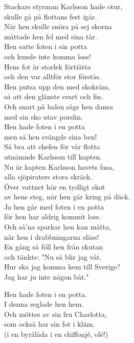 \documentclass[a6paper, 10pt, twoside]{article}
\begin{document}
\begin{center}
\end{center}
\vspace{-5pt}
\begin{lyrics}
\small Stackars styrman Karlsson hade otur,\\
skulle gå på flottans fest igår.\\
När hen skulle snöra på sej skorna\\
måttade hen fel med sina tår.
\vspace{5pt}\\
Hen satte foten i sin potta\\
och kunde inte komma loss!\\
Hens fot är storlek förtiåtta\\
och den var alltför stor förstås.
\vspace{5pt}\\
Hen putsa upp den med skokräm,\\
så att den glänste svart och fin.\\
Och snart på balen sågs hen dansa\\
med sin sko utav porslin.
\vspace{5pt}\\
Hen hade foten i en potta\\
men så hen svängde sina ben!\\
Så bra att chefen för vår flotta\\
utnämnde Karlsson till kapten.
\vspace{5pt}\\
Nu är kapten Karlsson havets fasa,\\
alla sjöpiraters stora skräck.\\
Över vattnet hör en tydligt ekot\\
av hens steg, när hen går kring på däck.
\vspace{5pt}\\
Ja hen går med foten i en potta\\
för hen har aldrig kommit loss.\\
Och så'na sparkar hen kan måtta,\\
när hen i drabbningarna slåss!
\vspace{5pt}\\
En gång så föll hen från skutan\\
och tänkte: "Nu så blir jag våt.\\
Hur ska jag komma hem till Sverige?\\
Jag har ju inte någon båt."

\newpage
Hen hade foten i en potta.\\
I denna seglade hen hem.\\
Och möttes av sin fru Charlotta,\\
som också har sin fot i kläm.\\
(i en byrålåda i en chiffonjé, olé!)
\end{lyrics}
\end{document}
